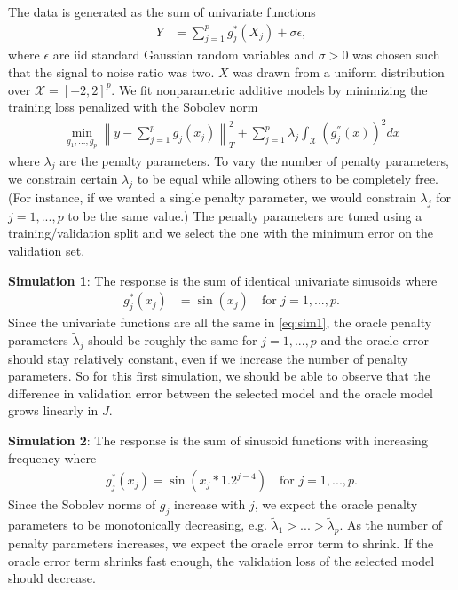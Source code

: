 \documentclass[12pt]{article} %
\theoremstyle{definition}
\begin{document}
The data is generated as the sum of univariate functions
\begin{align}
Y &= \sum_{j=1}^p g_j^*(X_j) + \sigma \epsilon,
\label{eq:sim_general}
\end{align}
where $\epsilon$ are iid standard Gaussian random variables and $\sigma > 0$ was chosen such that the signal to noise ratio was two. $X$ was drawn from a uniform distribution over $\mathcal{X} = [-2, 2]^p$.
We fit nonparametric additive models by minimizing the training loss penalized with the Sobolev norm
\begin{align}
\min_{g_1, ..., g_p} \left \| y - \sum_{j=1}^p g_j(x_j) \right \|_T^2 + \sum_{j=1}^p \lambda_j \int_{\mathcal{X}} \left (g_j^{''}(x) \right )^2 dx
\label{eq:penal_simulation}
\end{align}
where $\lambda_j$ are the penalty parameters.
To vary the number of penalty parameters, we constrain certain $\lambda_j$ to be equal while allowing others to be completely free.
(For instance, if we wanted a single penalty parameter, we would constrain $\lambda_j$ for $j=1,...,p$ to be the same value.) 
The penalty parameters are tuned using a training/validation split and we select the one with the minimum error on the validation set.

\textbf{Simulation 1}: The response is the sum of identical univariate sinusoids where
\begin{align}
g_j^*(x_j) &= \sin(x_j) \quad \text{for } j = 1,...,p.
\label{eq:sim1}
\end{align} 
Since the univariate functions are all the same in \eqref{eq:sim1}, the oracle penalty parameters $\tilde \lambda_j$ should be roughly the same for $j = 1,...,p$ and the oracle error should stay relatively constant, even if we increase the number of penalty parameters. So for this first simulation, we should be able to observe that the difference in validation error between the selected model and the oracle model grows linearly in $J$.

\textbf{Simulation 2}: The response is the sum of sinusoid functions with increasing frequency where
\begin{align}
g_j^*(x_j) = \sin(x_j * 1.2^{j - 4}) \quad \text{for } j = 1,...,p.
\label{eq:sim2}
\end{align}
Since the Sobolev norms of $g_j$ increase with $j$, we expect the oracle penalty parameters to be monotonically decreasing, e.g. $\tilde{\lambda}_1 > ... > \tilde{\lambda}_p$. 
As the number of penalty parameters increases, we expect the oracle error term to shrink. If the oracle error term shrinks fast enough, the validation loss of the selected model should decrease.
\end{document}
